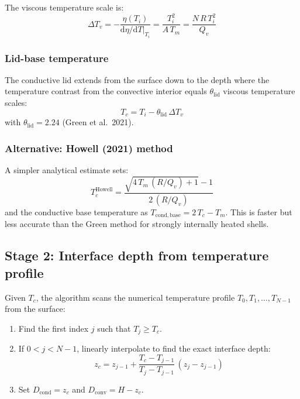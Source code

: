 \documentclass[11pt,a4paper]{article}
\newcommand{\dd}{\mathrm{d}}
\begin{document}
The viscous temperature scale is:
\begin{equation}
\Delta T_v = -\frac{\eta(T_i)}{\dd\eta/\dd T\big|_{T_i}}
  = \frac{T_i^2}{A\,T_m}
  = \frac{N\,R\,T_i^2}{Q_v}
\label{eq:DTv}
\end{equation}

\subsubsection{Lid-base temperature}

The conductive lid extends from the surface down to the depth where
the temperature contrast from the convective interior equals
$\theta_{\mathrm{lid}}$ viscous temperature scales:
\begin{equation}
\boxed{T_c = T_i - \theta_{\mathrm{lid}}\,\Delta T_v}
\label{eq:Tc}
\end{equation}
with $\theta_{\mathrm{lid}} = 2.24$ (Green et al.\ 2021).

\subsubsection{Alternative: Howell (2021) method}

A simpler analytical estimate sets:
\begin{equation}
T_c^{\mathrm{Howell}}
  = \frac{\sqrt{4\,T_m\,(R/Q_v) + 1} - 1}{2\,(R/Q_v)}
\end{equation}
and the conductive base temperature as $T_{\mathrm{cond,base}} = 2\,T_c - T_m$.
This is faster but less accurate than the Green method for strongly
internally heated shells.

\subsection{Stage 2: Interface depth from temperature profile}

Given $T_c$, the algorithm scans the numerical temperature profile
$T_0, T_1, \ldots, T_{N-1}$ from the surface:

\begin{enumerate}[leftmargin=2em]
\item Find the first index $j$ such that $T_j \geq T_c$.
\item If $0 < j < N{-}1$, linearly interpolate to find the exact
      interface depth:
\begin{equation}
z_c = z_{j-1} + \frac{T_c - T_{j-1}}{T_j - T_{j-1}}\,(z_j - z_{j-1})
\label{eq:zc_interp}
\end{equation}
\item Set $D_{\mathrm{cond}} = z_c$ and $D_{\mathrm{conv}} = H - z_c$.
\end{enumerate}
\end{document}
